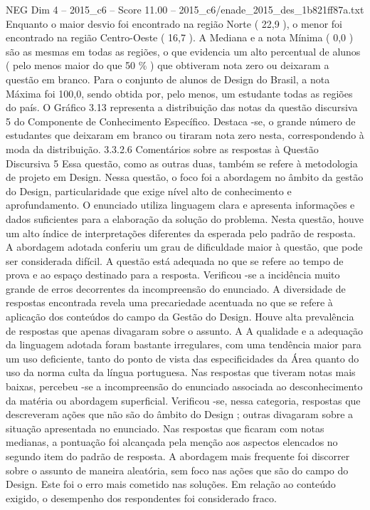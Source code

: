\begin{textsample}{NEG Dim 4 – 2015\_c6 – Score 11.00 – 2015\_c6/enade\_2015\_des\_1b821ff87a.txt}
Enquanto o maior desvio foi encontrado na região Norte ( 22,9 ), o menor foi encontrado na região Centro-Oeste ( 16,7 ).
A Mediana e a nota Mínima ( 0,0 ) são as mesmas em todas as regiões, o que evidencia um alto percentual de alunos ( pelo menos maior do que 50 \% ) que obtiveram nota zero ou deixaram a questão em branco.
Para o conjunto de alunos de Design do Brasil, a nota Máxima foi 100,0, sendo obtida por, pelo menos, um estudante todas as regiões do país.
O Gráfico 3.13 representa a distribuição das notas da questão discursiva 5 do Componente de Conhecimento Específico.
Destaca -se, o grande número de estudantes que deixaram em branco ou tiraram nota zero nesta, correspondendo à moda da distribuição. 3.3.2.6 Comentários sobre as respostas à Questão Discursiva 5 Essa questão, como as outras duas, também se refere à metodologia de projeto em Design.
Nessa questão, o foco foi a abordagem no âmbito da gestão do Design, particularidade que exige nível alto de conhecimento e aprofundamento.
O enunciado utiliza linguagem clara e apresenta informações e dados suficientes para a elaboração da solução do problema.
Nesta questão, houve um alto índice de interpretações diferentes da esperada pelo padrão de resposta.
A abordagem adotada conferiu um grau de dificuldade maior à questão, que pode ser considerada difícil.
A questão está adequada no que se refere ao tempo de prova e ao espaço destinado para a resposta.
Verificou -se a incidência muito grande de erros decorrentes da incompreensão do enunciado.
A diversidade de respostas encontrada revela uma precariedade acentuada no que se refere à aplicação dos conteúdos do campo da Gestão do Design.
Houve alta prevalência de respostas que apenas divagaram sobre o assunto.
A A qualidade e a adequação da linguagem adotada foram bastante irregulares, com uma tendência maior para um uso deficiente, tanto do ponto de vista das especificidades da Área quanto do uso da norma culta da língua portuguesa.
Nas respostas que tiveram notas mais baixas, percebeu -se a incompreensão do enunciado associada ao desconhecimento da matéria ou abordagem superficial.
Verificou -se, nessa categoria, respostas que descreveram ações que não são do âmbito do Design ; outras divagaram sobre a situação apresentada no enunciado.
Nas respostas que ficaram com notas medianas, a pontuação foi alcançada pela menção aos aspectos elencados no segundo item do padrão de resposta.
A abordagem mais frequente foi discorrer sobre o assunto de maneira aleatória, sem foco nas ações que são do campo do Design.
Este foi o erro mais cometido nas soluções.
Em relação ao conteúdo exigido, o desempenho dos respondentes foi considerado fraco.

\end{textsample}
